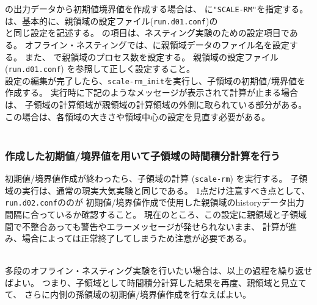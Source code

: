 \scalerm の出力データから初期値境界値を作成する場合は、
に\verb|"SCALE-RM"|を指定する。
は、基本的に、親領域の設定ファイル(\verb|run.d01.conf|)の\\
と同じ設定を記述する。
%
の項目は、ネスティング実験のための設定項目である。
オフライン・ネスティングでは、に親領域データのファイル名を設定する。
また、 で親領域のプロセス数を設定する。
親領域の設定ファイル(\verb|run.d01.conf|) を参照して正しく設定すること。\\


設定の編集が完了したら、\verb|scale-rm_init|を実行し、子領域の初期値/境界値を作成する。
実行時に下記のようなメッセージが表示されて計算が止まる場合は、
子領域の計算領域が親領域の計算領域の外側に取られている部分がある。
この場合は、各領域の大きさや領域中心の設定を見直す必要がある。\\

\\



\subsubsection{作成した初期値/境界値を用いて子領域の時間積分計算を行う}
初期値/境界値作成が終わったら、子領域の計算 (\verb|scale-rm|) を実行する。
子領域の実行は、通常の現実大気実験と同じである。
1点だけ注意すべき点として、
\verb|run.d02.conf|ののが
初期値/境界値作成で使用した親領域のhistoryデータ出力間隔に合っているか確認すること。
現在のところ、この設定に親領域と子領域間で不整合あっても警告やエラーメッセージが発せられないまま、
計算が進み、場合によっては正常終了してしまうため注意が必要である。


\\

\noindent
多段のオフライン・ネスティング実験を行いたい場合は、以上の過程を繰り返せばよい。
つまり、子領域として時間積分計算した結果を再度、親領域と見立てて、
さらに内側の孫領域の初期値/境界値作成を行なえばよい。
